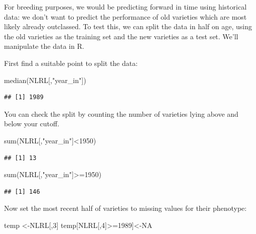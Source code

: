 \documentclass[
]{book}
\newenvironment{Shaded}{\begin{snugshade}}{\end{snugshade}}
\newcommand{\ConstantTok}[1]{\textcolor[rgb]{0.00,0.00,0.00}{#1}}
\newcommand{\DecValTok}[1]{\textcolor[rgb]{0.00,0.00,0.81}{#1}}
\newcommand{\FunctionTok}[1]{\textcolor[rgb]{0.00,0.00,0.00}{#1}}
\newcommand{\NormalTok}[1]{#1}
\newcommand{\OtherTok}[1]{\textcolor[rgb]{0.56,0.35,0.01}{#1}}
\newcommand{\SpecialCharTok}[1]{\textcolor[rgb]{0.00,0.00,0.00}{#1}}
\newcommand{\StringTok}[1]{\textcolor[rgb]{0.31,0.60,0.02}{#1}}
\begin{document}
For breeding purposes, we would be predicting forward in time using historical data: we
don't want to predict the performance of old varieties which are most likely already
outclassed. To test this, we can split the data in half on age, using the old varieties as the training set and the new varieties as a test set. We'll manipulate the data in R.

First find a suitable point to split the data:

\begin{Shaded}
\begin{Highlighting}[]
\FunctionTok{median}\NormalTok{(NLRL[,}\StringTok{"year\_in"}\NormalTok{])}
\end{Highlighting}
\end{Shaded}

\begin{verbatim}
## [1] 1989
\end{verbatim}

You can check the split by counting the number of varieties lying above and below your cutoff.

\begin{Shaded}
\begin{Highlighting}[]
\FunctionTok{sum}\NormalTok{(NLRL[,}\StringTok{"year\_in"}\NormalTok{]}\SpecialCharTok{\textless{}}\DecValTok{1950}\NormalTok{)}
\end{Highlighting}
\end{Shaded}

\begin{verbatim}
## [1] 13
\end{verbatim}

\begin{Shaded}
\begin{Highlighting}[]
\FunctionTok{sum}\NormalTok{(NLRL[,}\StringTok{"year\_in"}\NormalTok{]}\SpecialCharTok{\textgreater{}=}\DecValTok{1950}\NormalTok{)}
\end{Highlighting}
\end{Shaded}

\begin{verbatim}
## [1] 146
\end{verbatim}

Now set the most recent half of varieties to missing values for their phenotype:

\begin{Shaded}
\begin{Highlighting}[]
\NormalTok{temp }\OtherTok{\textless{}{-}}\NormalTok{NLRL[,}\DecValTok{3}\NormalTok{]}
\NormalTok{temp[NLRL[,}\DecValTok{4}\NormalTok{]}\SpecialCharTok{\textgreater{}=}\DecValTok{1989}\NormalTok{]}\OtherTok{\textless{}{-}}\ConstantTok{NA}
\end{Highlighting}
\end{Shaded}
\end{document}
